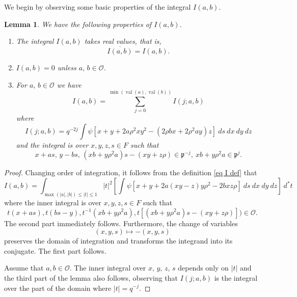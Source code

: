 \documentclass[12pt]{amsart}
\newcommand{\abs}[1]{\left|{#1}\right|}
\newcommand{\p}{\mathfrak{p}}
\renewcommand{\O}{\mathcal{O}}
\newcommand{\val}{{\operatorname{val}}}
\newtheorem{lemma}[theorem]{Lemma}
\theoremstyle{remark}
\begin{document}
\subsubsection{} We begin by observing some basic properties of the integral $I(a,b)$.
\begin{lemma}\label{lem I props}
We have the following properties of $I(a,b)$.
\begin{enumerate}
\item\label{part I real} The integral $I(a,b)$ takes real values, that is, 
\[
\overline{I(a,b)}=I(a,b).
\]
\item\label{part zero not O} $I(a,b)=0$ unless $a,\,b\in \O$.
\item For $a,\,b\in \O$ we have
\begin{equation}\label{eq I as  sum Ij}
I(a,b)=\sum_{j=0}^{\min(\val(a),\val(b))}I(j;a,b)
\end{equation}
where
\[
I(j;a,b)=q^{-2j}\int \psi[x+y+2a\rho^2xy^2-(2\rho bx+2\rho^2ay)z]  \ ds\ dx\ dy\ dz
\]
and the integral is over $x,y,z,s\in F$ such that
$$
x+as,\,y-bs,\,(xb+y\rho^2a)s-(xy+z\rho)\in \p^{-j},\ xb+y\rho^2a\in \p^j.
$$ 
\end{enumerate}
\end{lemma}
\begin{proof}
Changing order of integration, it follows from the definition \eqref{eq I def} that 
\[
I(a,b)=\int_{\max(\abs{a},\abs{b})\le \abs{t}\le 1}\abs{t}^2 \left[\int \psi[x+y+2a(xy-z)y\rho^2-2bxz\rho]  \ ds\ dx\ dy\ dz\right]\ d^*t
\]
where the inner integral is over $x,y,z,s\in F$ such that
\[
t(x+as),t(bs-y),t^{-1}(xb+y\rho^2a),t[(xb+y\rho^2a)s-(xy+z\rho)])\in \O.
\]
The second part immediately follows.
Furthermore, the change of variables 
\[
(x,y,s)\mapsto -(x,y,s)
\] 
preserves the domain of integration and transforms the integrand into its conjugate. The first part follows. 

Assume that $a,b\in \O$. The inner integral over $x,\,y,\,z,\,s$ depends only on $\abs{t}$ and the third part of the lemma also follows, observing that $I(j;a,b)$ is the integral over the part of the domain where $\abs{t}=q^{-j}$.
\end{proof}
\end{document}
